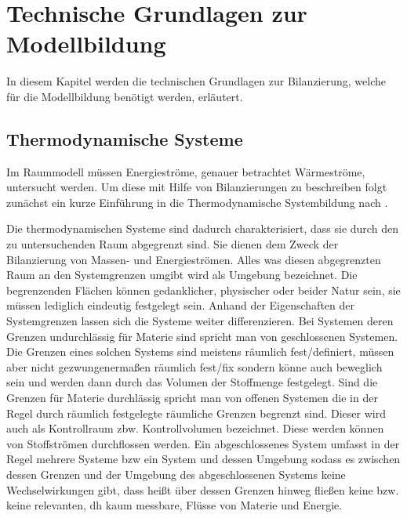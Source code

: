\section{Technische Grundlagen zur Modellbildung}
\label{sec:grundlagenmodell}
In diesem Kapitel werden die technischen Grundlagen zur Bilanzierung, welche für die Modellbildung benötigt werden, erläutert.

\subsection{Thermodynamische Systeme}
Im Raummodell müssen Energieströme, genauer betrachtet Wärmeströme, untersucht werden. Um diese mit Hilfe von Bilanzierungen zu beschreiben folgt zunächst ein kurze Einführung in die Thermodynamische Systembildung nach \cite[S.~11ff.]{ba12}.


Die thermodynamischen Systeme sind dadurch charakterisiert, dass sie durch den zu untersuchenden Raum abgegrenzt sind. Sie dienen dem Zweck der Bilanzierung von Massen- und Energieströmen. Alles was diesen abgegrenzten Raum an den Systemgrenzen umgibt wird als Umgebung bezeichnet. Die begrenzenden Flächen können gedanklicher, physischer oder beider Natur sein, sie müssen lediglich eindeutig festgelegt sein.
Anhand der Eigenschaften der Systemgrenzen lassen sich die Systeme weiter differenzieren.
Bei Systemen deren Grenzen undurchlässig für Materie sind spricht man von geschlossenen Systemen. Die Grenzen eines solchen Systems sind meistens räumlich fest/definiert, müssen aber nicht gezwungenermaßen räumlich fest/fix sondern könne auch beweglich sein und werden dann durch das Volumen der Stoffmenge festgelegt.
Sind die Grenzen für Materie durchlässig spricht man von offenen Systemen die in der Regel durch räumlich festgelegte räumliche Grenzen begrenzt sind. Dieser wird auch als Kontrollraum zbw. Kontrollvolumen bezeichnet. Diese werden können von Stoffströmen durchflossen werden.
Ein abgeschlossenes System umfasst in der Regel mehrere Systeme \acrlong{bzw} ein System und dessen Umgebung sodass es zwischen dessen Grenzen und der Umgebung des abgeschlossenen Systems keine Wechselwirkungen gibt, dass heißt über dessen Grenzen hinweg fließen keine bzw. keine relevanten, dh kaum messbare, Flüsse von Materie und Energie.


